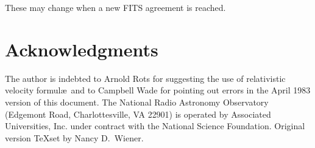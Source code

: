 These may change when a new FITS agreement is reached.


\section{Acknowledgments}

     The author is indebted to Arnold Rots for suggesting the use of
relativistic velocity formul\ae\ and to Campbell Wade for pointing out
errors in the April 1983 version of this document.  The National Radio
Astronomy Observatory (Edgemont Road, Charlottesville, VA 22901) is
operated by Associated Universities, Inc. under contract with the
National Science Foundation.  Original version \TeX set by Nancy D.\
Wiener.


